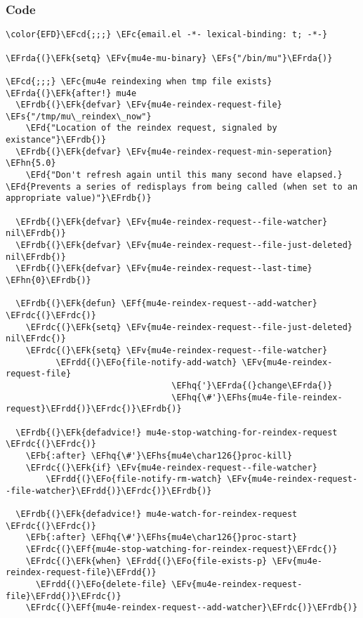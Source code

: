 \documentclass[a4wide,10pt]{article}
\newcommand{\EFc}[1]{\textcolor{EFc}{#1}} %
\newcommand{\EFcd}[1]{\textcolor{EFcd}{#1}} %
\newcommand{\EFs}[1]{\textcolor{EFs}{#1}} %
\newcommand{\EFd}[1]{\textcolor{EFd}{#1}} %
\newcommand{\EFk}[1]{\textcolor{EFk}{#1}} %
\newcommand{\EFb}[1]{\textcolor{EFb}{#1}} %
\newcommand{\EFf}[1]{\textcolor{EFf}{#1}} %
\newcommand{\EFv}[1]{\textcolor{EFv}{#1}} %
\newcommand{\EFo}[1]{\textcolor{EFo}{#1}} %
\newcommand{\EFhn}[1]{\textcolor{EFhn}{\textbf{#1}}} %
\newcommand{\EFhq}[1]{\textcolor{EFhq}{#1}} %
\newcommand{\EFhs}[1]{\textcolor{EFhs}{#1}} %
\newcommand{\EFrda}[1]{\textcolor{EFrda}{#1}} %
\newcommand{\EFrdb}[1]{\textcolor{EFrdb}{#1}} %
\newcommand{\EFrdc}[1]{\textcolor{EFrdc}{#1}} %
\newcommand{\EFrdd}[1]{\textcolor{EFrdd}{#1}} %
\begin{document}
\subsubsection{Code}
\label{sec:orgc37efc1}
\begin{Code}
\begin{Verbatim}
\color{EFD}\EFcd{;;;} \EFc{email.el -*- lexical-binding: t; -*-}

\EFrda{(}\EFk{setq} \EFv{mu4e-mu-binary} \EFs{"/bin/mu"}\EFrda{)}

\EFcd{;;;} \EFc{mu4e reindexing when tmp file exists}
\EFrda{(}\EFk{after!} mu4e
  \EFrdb{(}\EFk{defvar} \EFv{mu4e-reindex-request-file} \EFs{"/tmp/mu\_reindex\_now"}
    \EFd{"Location of the reindex request, signaled by existance"}\EFrdb{)}
  \EFrdb{(}\EFk{defvar} \EFv{mu4e-reindex-request-min-seperation} \EFhn{5.0}
    \EFd{"Don't refresh again until this many second have elapsed.}
\EFd{Prevents a series of redisplays from being called (when set to an appropriate value)"}\EFrdb{)}

  \EFrdb{(}\EFk{defvar} \EFv{mu4e-reindex-request--file-watcher} nil\EFrdb{)}
  \EFrdb{(}\EFk{defvar} \EFv{mu4e-reindex-request--file-just-deleted} nil\EFrdb{)}
  \EFrdb{(}\EFk{defvar} \EFv{mu4e-reindex-request--last-time} \EFhn{0}\EFrdb{)}

  \EFrdb{(}\EFk{defun} \EFf{mu4e-reindex-request--add-watcher} \EFrdc{(}\EFrdc{)}
    \EFrdc{(}\EFk{setq} \EFv{mu4e-reindex-request--file-just-deleted} nil\EFrdc{)}
    \EFrdc{(}\EFk{setq} \EFv{mu4e-reindex-request--file-watcher}
          \EFrdd{(}\EFo{file-notify-add-watch} \EFv{mu4e-reindex-request-file}
                                 \EFhq{'}\EFrda{(}change\EFrda{)}
                                 \EFhq{\#'}\EFhs{mu4e-file-reindex-request}\EFrdd{)}\EFrdc{)}\EFrdb{)}

  \EFrdb{(}\EFk{defadvice!} mu4e-stop-watching-for-reindex-request \EFrdc{(}\EFrdc{)}
    \EFb{:after} \EFhq{\#'}\EFhs{mu4e\char126{}proc-kill}
    \EFrdc{(}\EFk{if} \EFv{mu4e-reindex-request--file-watcher}
        \EFrdd{(}\EFo{file-notify-rm-watch} \EFv{mu4e-reindex-request--file-watcher}\EFrdd{)}\EFrdc{)}\EFrdb{)}

  \EFrdb{(}\EFk{defadvice!} mu4e-watch-for-reindex-request \EFrdc{(}\EFrdc{)}
    \EFb{:after} \EFhq{\#'}\EFhs{mu4e\char126{}proc-start}
    \EFrdc{(}\EFf{mu4e-stop-watching-for-reindex-request}\EFrdc{)}
    \EFrdc{(}\EFk{when} \EFrdd{(}\EFo{file-exists-p} \EFv{mu4e-reindex-request-file}\EFrdd{)}
      \EFrdd{(}\EFo{delete-file} \EFv{mu4e-reindex-request-file}\EFrdd{)}\EFrdc{)}
    \EFrdc{(}\EFf{mu4e-reindex-request--add-watcher}\EFrdc{)}\EFrdb{)}


\end{Verbatim}
\end{Code}
\end{document}
